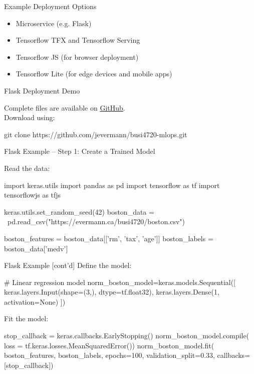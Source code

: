 \documentclass[ignorenonframetext,xcolor=x11names]{beamer}
\begin{document}
\begin{frame}[label=withcode]{Example Deployment Options}
\begin{itemize}
   \item Microservice (e.g. Flask)
   \item Tensorflow TFX and Tensorflow Serving 
   \item Tensorflow JS (for browser deployment)
   \item Tensorflow Lite (for edge devices and mobile apps)
\end{itemize}
\end{frame}

\begin{frame}[label=withcode,fragile]{Flask Deployment Demo}

Complete files are available on \href{https://github.com/jevermann/busi4720-mlops/blob/main/train_model.py}{GitHub}. \\

Download using:
\begin{bashcode}
git clone https://github.com/jevermann/busi4720-mlops.git
\end{bashcode}

\end{frame}

\begin{frame}[label=withcode,fragile]{Flask Example -- Step 1: Create a Trained Model} 

Read the data:
\begin{pythoncode}
import keras.utils
import pandas as pd
import tensorflow as tf
import tensorflowjs as tfjs

keras.utils.set_random_seed(42)
boston_data = \
 pd.read_csv("https://evermann.ca/busi4720/boston.csv")

boston_features = boston_data[['rm', 'tax', 'age']]
boston_labels = boston_data['medv']
\end{pythoncode}

\end{frame}

\begin{frame}[label=withcode,fragile]{Flask Example \small [cont'd]}
Define the model:
\begin{pythoncode}
# Linear regression model
norm_boston_model=keras.models.Sequential([
    keras.layers.Input(shape=(3,), dtype=tf.float32),
    keras.layers.Dense(1, activation=None) ])
\end{pythoncode}

Fit the model:
\begin{pythoncode}
stop_callback = keras.callbacks.EarlyStopping()
norm_boston_model.compile(
    loss = tf.keras.losses.MeanSquaredError())
norm_boston_model.fit(
    boston_features, boston_labels,
    epochs=100, validation_split=0.33,
    callbacks=[stop_callback])
\end{pythoncode}
\end{frame}
\end{document}
